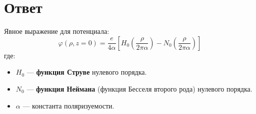 \documentclass{article}
\begin{document}
\section*{Ответ}

Явное выражение для потенциала:
\[
\boxed{\varphi(\rho, z = 0) = \dfrac{e}{4\alpha} \left[ H_0\left( \dfrac{\rho}{2\pi \alpha} \right) - N_0\left( \dfrac{\rho}{2\pi \alpha} \right) \right]}
\]
где:
\begin{itemize}
    \item \( H_0 \) — \textbf{функция Струве} нулевого порядка.
    \item \( N_0 \) — \textbf{функция Неймана} (функция Бесселя второго рода) нулевого порядка.
    \item \( \alpha \) — константа поляризуемости.
\end{itemize}
\end{document}
